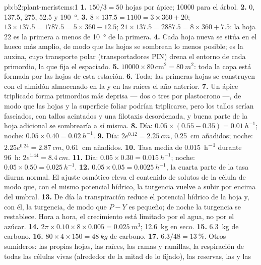 \begin{solution}{pb:b2:plant-meristems:1}
\textbf{1.} $150/3 = 50$ hojas por ápice; \num{10000} para el árbol.
\textbf{2.} 0, 137.5, 275, 52.5 y \qty{190}{\degree}.
\textbf{3.} $8\times 137.5 = 1100 = 3\times 360 + 20$; $13\times 137.5
= 1787.5 = 5\times 360 - 12.5$; $21\times 137.5 = 2887.5 = 8\times 360
+ 7.5$: la hoja 22 es la primera a menos de \qty{10}{\degree} de la
primera.
\textbf{4.} Cada hoja nueva se sitúa en el hueco más amplio, de modo que
las hojas se sombrean lo menos posible; es la auxina, cuyo transporte
polar (transportadores PIN) drena el entorno de cada primordio, la que
fija el espaciado.
\textbf{5.} $\num{10000}\times 80\,\text{cm}^{2} = \qty{80}{m^2}$: toda la
copa está formada por las hojas de esta estación.
\textbf{6.} Toda; las primeras hojas se construyen con el almidón
almacenado en la  y en las raíces el año anterior.
\textbf{7.} Un ápice triplicado forma primordios más deprisa --- dos o tres
por plastocrono ---, de modo que las hojas y la superficie foliar podrían
triplicarse, pero los tallos serían fasciados, con tallos acintados y una
filotaxis desordenada, y buena parte de la hoja adicional se sombrearía a
sí misma.
\textbf{8.} Día: $0.05\times(0.55 - 0.35) = \qty{0.01}{h^{-1}}$; noche:
$0.05\times 0.40 = \qty{0.02}{h^{-1}}$.
\textbf{9.} Día: $2e^{0.12} = \qty{2.25}{cm}$, \qty{0.25}{cm} añadidos;
noche: $2.25e^{0.24} = \qty{2.87}{cm}$, \qty{0.61}{cm} añadidos.
\textbf{10.} Tasa media de \qty{0.015}{h^{-1}} durante \qty{96}{h}: $2e^{1.44}
= \qty{8.4}{cm}$.
\textbf{11.} Día: $0.05\times 0.30 = \qty{0.015}{h^{-1}}$; noche:
$0.05\times 0.50 = \qty{0.025}{h^{-1}}$.
\textbf{12.} $0.05\times 0.05 = \qty{0.0025}{h^{-1}}$, la cuarta parte de la
tasa diurna normal. El ajuste osmótico eleva el contenido de solutos de la
célula de modo que, con el mismo potencial hídrico, la turgencia vuelve a
subir por encima del umbral.
\textbf{13.} De día la transpiración reduce el potencial hídrico de la hoja
y, con él, la turgencia, de modo que $P - Y$ es pequeño; de noche la
turgencia se restablece. Hora a hora, el crecimiento está limitado por el
agua, no por el azúcar.
\textbf{14.} $2\pi\times 0.10\times 8\times 0.005 = \qty{0.025}{m^3}$;
\qty{12.6}{kg} en seco.
\textbf{15.} \qty{6.3}{kg} de carbono.
\textbf{16.} $80\times 4\times 150 = \qty{48}{kg}$ de carbono.
\textbf{17.} $6.3/48 = \qty{13}{\%}$. Otros sumideros: las propias hojas,
las raíces, las ramas y ramillas, la respiración de todas las células
vivas (alrededor de la mitad de lo fijado), las reservas, las  y las

\end{solution}
